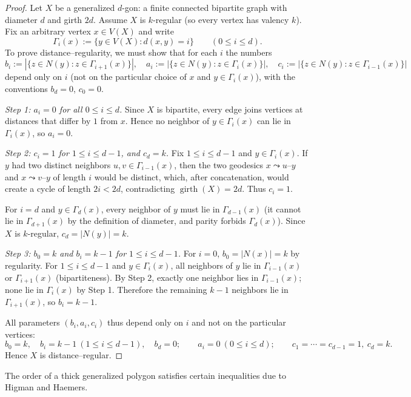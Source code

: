 \documentclass[12pt,a4paper,openany]{book}
\begin{document}
\begin{proof}
Let $X$ be a generalized $d$-gon: a finite connected bipartite graph with diameter $d$ and girth $2d$.
Assume $X$ is $k$-regular (so every vertex has valency $k$).  
Fix an arbitrary vertex $x\in V(X)$ and write
\[
\Gamma_i(x):=\{y\in V(X): d(x,y)=i\}\qquad (0\le i\le d).
\]
To prove distance–regularity, we must show that for each $i$ the numbers
\[
b_i:=|\{z\in N(y): z\in \Gamma_{i+1}(x)\}|,\quad
a_i:=|\{z\in N(y): z\in \Gamma_{i}(x)\}|,\quad
c_i:=|\{z\in N(y): z\in \Gamma_{i-1}(x)\}|
\]
depend only on $i$ (not on the particular choice of $x$ and $y\in\Gamma_i(x)$), with the conventions
$b_d=0$, $c_0=0$.

\smallskip
\emph{Step 1: $a_i=0$ for all $0\le i\le d$.}
Since $X$ is bipartite, every edge joins vertices at distances that differ by $1$ from $x$. Hence no neighbor of $y\in\Gamma_i(x)$ can lie in $\Gamma_i(x)$, so $a_i=0$.

\smallskip
\emph{Step 2: $c_i=1$ for $1\le i\le d-1$, and $c_d=k$.}
Fix $1\le i\le d-1$ and $y\in\Gamma_i(x)$. If $y$ had two distinct neighbors $u,v\in\Gamma_{i-1}(x)$, then the two geodesics $x\leadsto u\text{--}y$ and $x\leadsto v\text{--}y$ of length $i$ would be distinct, which, after concatenation, would create a cycle of length $2i<2d$, contradicting $\operatorname{girth}(X)=2d$. Thus $c_i=1$.

For $i=d$ and $y\in\Gamma_d(x)$, every neighbor of $y$ must lie in $\Gamma_{d-1}(x)$ (it cannot lie in $\Gamma_{d+1}(x)$ by the definition of diameter, and parity forbids $\Gamma_d(x)$). Since $X$ is $k$-regular, $c_d=|N(y)|=k$.

\smallskip
\emph{Step 3: $b_0=k$ and $b_i=k-1$ for $1\le i\le d-1$.}
For $i=0$, $b_0=|N(x)|=k$ by regularity.  
For $1\le i\le d-1$ and $y\in\Gamma_i(x)$, all neighbors of $y$ lie in $\Gamma_{i-1}(x)$ or $\Gamma_{i+1}(x)$ (bipartiteness). By Step 2, exactly one neighbor lies in $\Gamma_{i-1}(x)$; none lie in $\Gamma_i(x)$ by Step 1. Therefore the remaining $k-1$ neighbors lie in $\Gamma_{i+1}(x)$, so $b_i=k-1$.

\smallskip
All parameters $(b_i,a_i,c_i)$ thus depend only on $i$ and not on the particular vertices:
\[
b_0=k,\quad b_i=k-1\ (1\le i\le d-1),\quad b_d=0; \qquad
a_i=0\ (0\le i\le d);\qquad
c_1=\cdots=c_{d-1}=1,\ c_d=k.
\]
Hence $X$ is distance–regular.
\end{proof}

The order of a thick generalized polygon satisfies certain inequalities due to Higman and Haemers.
\end{document}
